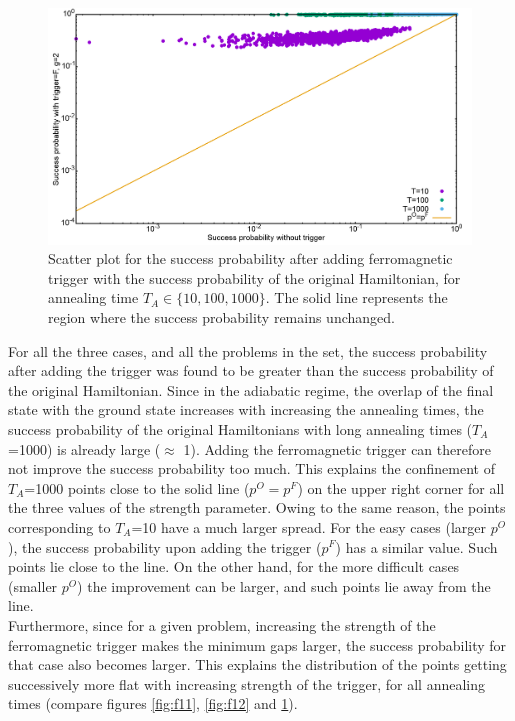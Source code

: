 \documentclass[12]{article}
\begin{document}
\begin{figure}[H]
\centering
\includegraphics[scale=0.3]{Scatt_s12_F_g2.png}
\caption{Scatter plot for the success probability after adding ferromagnetic trigger with the success probability of the original Hamiltonian, for annealing time $T_A \in \{10,100,1000\}$. The solid line represents the region where the success probability remains unchanged.}
\label{fig:f13}
\end{figure}

For all the three cases, and all the problems in the set, the success probability after adding the trigger was found to be greater than the success probability of the original Hamiltonian. Since in the adiabatic regime, the overlap of the final state with the ground state increases with increasing the annealing times, the success probability of the original Hamiltonians with long annealing times ($T_A$=1000) is already large ($\approx$ 1). Adding the ferromagnetic trigger can therefore not improve the success probability too much. This explains the confinement of $T_A$=1000 points close to the solid line ($p^O=p^F$) on the upper right corner for all the three values of the strength parameter. Owing to the same reason, the points corresponding to $T_A$=10 have a much larger spread. For the easy cases (larger $p^O$), the success probability upon adding the trigger ($p^F$) has a similar value. Such points lie close to the line. On the other hand, for the more difficult cases (smaller $p^O$) the improvement can be larger, and such points lie away from the line.\\

Furthermore, since for a given problem, increasing the strength of the ferromagnetic trigger makes the minimum gaps larger, the success probability for that case also becomes larger. This explains the distribution of the points getting successively more flat with increasing strength of the trigger, for all annealing times (compare figures \ref{fig:f11}, \ref{fig:f12} and \ref{fig:f13}).\\
\end{document}
